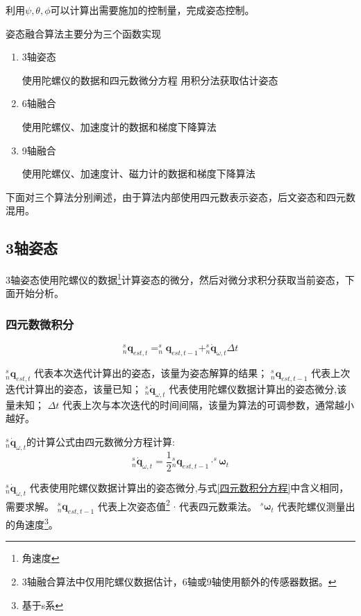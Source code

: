 \documentclass[12pt,a4paper]{article}
\begin{document}
利用$\psi,\theta,\phi$可以计算出需要施加的控制量，完成姿态控制。

姿态融合算法主要分为三个函数实现
\begin{enumerate}
    \item 3轴姿态

        使用陀螺仪的数据和四元数微分方程 用积分法获取估计姿态
    \item 6轴融合

        使用陀螺仪、加速度计的数据和梯度下降算法
    \item 9轴融合

        使用陀螺仪、加速度计、磁力计的数据和梯度下降算法
\end{enumerate}

下面对三个算法分别阐述，由于算法内部使用四元数表示姿态，后文姿态和四元数混用。

\subsection{3轴姿态}
3轴姿态使用陀螺仪的数据\footnote{角速度}计算姿态的微分，然后对微分求积分获取当前姿态，下面开始分析。
\subsubsection{四元数微积分}
\begin{equation}\label{四元数积分方程}
    ^s_n\bm{q}_{est,t}=^s_n\bm{q}_{est,t-1}+^s_n\dot{{\bm{q}}}_{\omega,t} \Delta t
\end{equation} 

$^s_n\bm{q}_{est,t}$            代表本次迭代计算出的姿态，该量为姿态解算的结果；
$^s_n\bm{q}_{est,t-1}$          代表上次迭代计算出的姿态，该量已知；
$^s_n\dot{{\bm{q}}}_{\omega,t}$ 代表使用陀螺仪数据计算出的姿态微分,该量未知；
$\Delta t$                          代表上次与本次迭代的时间间隔，该量为算法的可调参数，通常越小越好。

$^s_n\dot{{\bm{q}}}_{\omega,t}$的计算公式由四元数微分方程计算:
\begin{equation}\label{四元数微分方程}
    ^s_n\dot{{\bm{q}}}_{\omega,t}=\frac{1}{2}{^s_n\bm{q}_{est,t-1}}\cdot^s{\bm{\omega}}_t
\end{equation} 

$^s_n\dot{{\bm{q}}}_{\omega,t}$ 代表使用陀螺仪数据计算出的姿态微分,与式\ref{四元数积分方程}中含义相同，需要求解。
$^s_n\bm{q}_{est,t-1}$          代表上次姿态值\footnote{3轴融合算法中仅用陀螺仪数据估计，6轴或9轴使用额外的传感器数据。}
$\cdot$                             代表四元数乘法。
$^s\bm{\omega}_t$               代表陀螺仪测量出的角速度\footnote{基于s系}。
\end{document}
